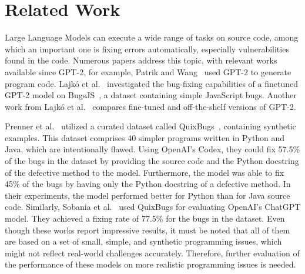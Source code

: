
\section{Related Work}
\label{sec:related}

Large Language Models can execute a wide range of tasks on source code, among which an important one is fixing errors automatically, especially vulnerabilities~\cite{apr} found in the code.
Numerous papers address this topic, with relevant works available since GPT-2, for example, Patrik and Wang~\cite{gpt2-code-gen} used GPT-2 to generate program code.
Lajk\'o et al.~\cite{gpt2-lajko} investigated the bug-fixing capabilities of a finetuned GPT-2 model on BugsJS~\cite{bugs_js}, a dataset containing simple JavaScript bugs.
Another work from Lajk\'o et al.~\cite{gpt2-lajko2} compares fine-tuned and off-the-shelf versions of GPT-2.



Prenner et al.~\cite{codex_bug_fix} utilized a curated dataset called QuixBugs~\cite{quix_bugs}, containing synthetic examples.
This dataset comprises 40 simpler programs written in Python and Java, which are intentionally flawed.
Using OpenAI's Codex, they could fix 57.5\% of the bugs in the dataset by providing the source code and the Python docstring of the defective method to the model.
Furthermore, the model was able to fix 45\% of the bugs by having only the Python docstring of a defective method.
In their experiments, the model performed better for Python than for Java source code.
Similarly, Sobania et al.~\cite{quix_bugs_abuser_2} used QuixBugs for evaluating OpenAI's ChatGPT model.
They achieved a fixing rate of 77.5\%  for the bugs in the dataset.
Even though these works report impressive results, it must be noted that all of them are based on a set of small, simple, and synthetic programming issues, which might not reflect real-world challenges accurately.
Therefore, further evaluation of the performance of these models on more realistic programming issues is needed.

